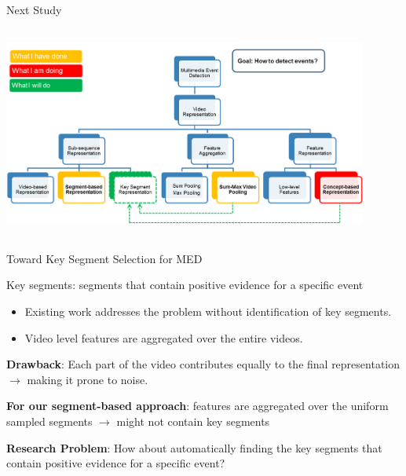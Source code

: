 \documentclass{beamer}
\begin{document}
\begin{frame}[t]{Next Study}
\begin{center}
\includegraphics[width=12cm,height=7cm]{images/bigpicture2.png}
\end{center}

\end{frame}

\begin{frame}[t]{Toward Key Segment Selection for MED}

\begin{definition}
Key segments: segments that contain positive evidence for a specific event
\end{definition}

\begin{itemize}
\item Existing work addresses the problem without identification of key segments. 
\item Video level features are aggregated over the entire videos.
\end{itemize}

\textbf{Drawback}: Each part of the video contributes equally to the final representation $\rightarrow$ making it prone to noise. 

\textbf{For our segment-based approach}: features are aggregated over the uniform sampled segments $\rightarrow$ might not contain key segments

\textbf{Research Problem}: How about automatically finding the key segments that contain positive evidence for a specific event?

\end{frame}
\end{document}

